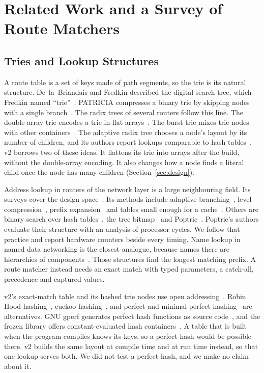\section{Related Work and a Survey of Route Matchers}\label{sec:related}

\subsection{Tries and Lookup Structures}

A route table is a set of keys made of path segments, so the trie is its natural structure.
De~la~Briandais and Fredkin described the digital search tree, which Fredkin named
``trie''~\cite{delabriandais1959file,fredkin1960trie}. PATRICIA compresses a binary trie by skipping
nodes with a single branch~\cite{morrison1968patricia}. The radix trees of several routers follow
this line. The double-array trie encodes a trie in flat arrays~\cite{aoe1989doublearray}. The burst
trie mixes trie nodes with other containers~\cite{heinz2002burst}. The adaptive radix tree chooses
a node's layout by its number of children, and its authors report lookups comparable to hash
tables~\cite{leis2013art}. v2 borrows two of these ideas. It flattens its trie into arrays after the
build, without the double-array encoding. It also changes how a node finds a literal child once the
node has many children (Section~\ref{sec:design}).

Address lookup in routers of the network layer is a large neighbouring field. Its surveys cover
the design space~\cite{ruizsanchez2001survey,gupta2001classification,taylor2005survey}. Its methods
include adaptive branching~\cite{andersson1993adaptive}, level compression~\cite{nilsson1999lctrie},
prefix expansion~\cite{srinivasan1999cpe} and tables small enough for a cache~\cite{degermark1997small}.
Others are binary search over hash tables~\cite{waldvogel1997scalable}, the tree
bitmap~\cite{eatherton2004treebitmap} and Poptrie~\cite{asai2015poptrie}. Poptrie's authors evaluate their structure with an analysis of
processor cycles. We follow that practice and report hardware counters beside every timing.
Name lookup in named data networking is the closest analogue, because names there are hierarchies
of components~\cite{wang2012nce,so2013ndn,yuan2015lnpm}. Those structures find the longest matching
prefix. A route matcher instead needs an exact match with typed parameters, a catch-all, precedence
and captured values.

v2's exact-match table and its hashed trie nodes use open addressing~\cite{peterson1957addressing}.
Robin Hood hashing~\cite{celis1985robinhood}, cuckoo hashing~\cite{pagh2004cuckoo}, and perfect and
minimal perfect hashing~\cite{fredman1984sparse,czech1992optimal,belazzougui2009chd,pibiri2021pthash}
are alternatives.
GNU gperf generates perfect hash functions as source code~\cite{gnu2025gperf}, and the frozen library
offers constant-evaluated hash containers~\cite{guelton2024frozen}. A table that is built when the
program compiles knows its keys, so a perfect hash would be possible there. v2 builds the same layout
at compile time and at run time instead, so that one lookup serves both. We did not test a perfect
hash, and we make no claim about it.

